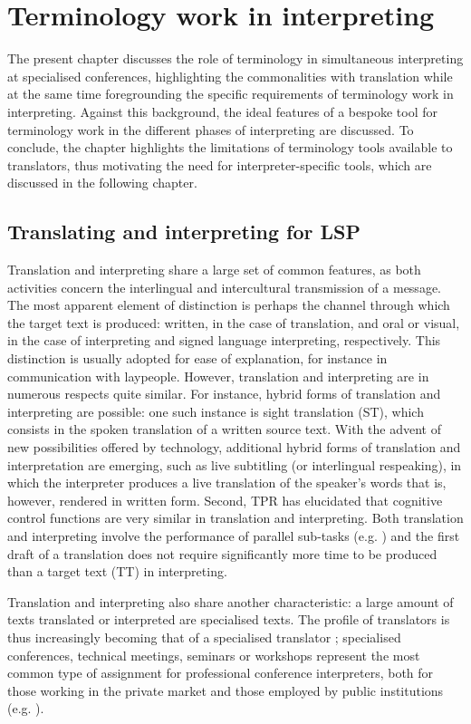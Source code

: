 \chapter{Terminology work in interpreting} \label{chapter1}

The present chapter discusses the role of terminology in simultaneous interpreting at specialised conferences, highlighting the commonalities with translation while at the same time foregrounding the specific requirements of terminology work in interpreting. Against this background, the ideal features of a bespoke tool for terminology work in the different phases of interpreting are discussed. To conclude, the chapter highlights the limitations of terminology tools available to translators, thus motivating the need for interpreter-specific tools, which are discussed in the following chapter.

\section{Translating and interpreting for LSP} \label{LSP}
Translation and interpreting share a large set of common features, as both activities concern the interlingual and intercultural transmission of a message. The most apparent element of distinction is perhaps the channel through which the target text is produced: written, in the case of translation, and oral or visual, in the case of interpreting and signed language interpreting, respectively. This distinction is usually adopted for ease of explanation, for instance in communication with laypeople. However, translation and interpreting are in numerous respects quite similar. For instance, hybrid forms of translation and interpreting are possible: one such instance is sight translation (ST), which consists in the spoken translation of a written source text. With the advent of new possibilities offered by technology, additional hybrid forms of translation and interpretation are emerging, such as live subtitling (or interlingual respeaking), in which the interpreter produces a live translation of the speaker's words that is, however, rendered in written form. Second, TPR has elucidated that cognitive control functions are very similar in translation and interpreting. Both translation and interpreting involve the performance of parallel sub-tasks (e.g. \citealt{vardaro_translation_2019}) and the first draft of a translation does not require significantly more time to be produced than a target text (TT) in interpreting.

Translation and interpreting also share another characteristic: a large amount of texts translated or interpreted are specialised texts. The profile of translators is thus increasingly becoming that of a specialised translator \citep{campo2005politics}; specialised conferences, technical meetings, seminars or workshops represent the most common type of assignment for professional conference interpreters, both for those working in the private market and those employed by public institutions (e.g. \citealt[22]{rutten2008zielgerichtet}).

